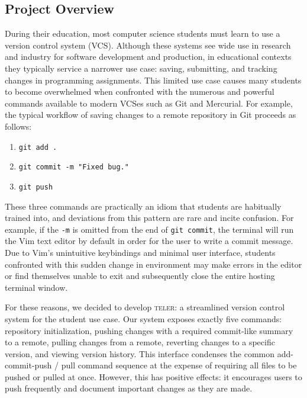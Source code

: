 \documentclass[12pt, letterpaper]{article}
\begin{document}
\maketitle
\begin{multicols}{2}
  \section{Project Overview}
  \label{sec:overview}

  During their education, most computer science students must learn to
  use a version control system (VCS). Although these systems see wide
  use in research and industry for software development and
  production, in educational contexts they typically service a
  narrower use case: saving, submitting, and tracking changes in
  programming assignments. This limited use case causes many students
  to become overwhelmed when confronted with the numerous and powerful
  commands available to modern VCSes such as Git and Mercurial. For
  example, the typical workflow of saving changes to a remote
  repository in Git proceeds as follows:

  \begin{enumerate}
  \item \texttt{git add .}
  \item \texttt{git commit -m "Fixed bug."}
  \item \texttt{git push}
  \end{enumerate}

  These three commands are practically an idiom that students are
  habitually trained into, and deviations from this pattern are rare
  and incite confusion. For example, if the \texttt{-m} is omitted
  from the end of \texttt{git commit}, the terminal will run the Vim
  text editor by default in order for the user to write a commit
  message. Due to Vim's unintuitive keybindings and minimal user
  interface, students confronted with this sudden change in
  environment may make errors in the editor or find themselves unable
  to exit and subsequently close the entire hosting terminal window.

  For these reasons, we decided to develop \textsc{teler}: a
  streamlined version control system for the student use case. Our
  system exposes exactly five commands: repository initialization,
  pushing changes with a required commit-like summary to a remote,
  pulling changes from a remote, reverting changes to a specific
  version, and viewing version history. This interface condenses the
  common add-commit-push / pull command sequence at the expense of
  requiring all files to be pushed or pulled at once. However, this
  has positive effects: it encourages users to push frequently and
  document important changes as they are made.


\end{multicols}
\end{document}
